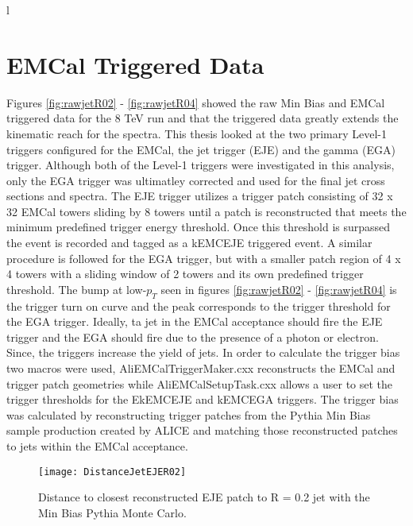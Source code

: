 

l

\section{EMCal Triggered Data}

Figures \ref{fig:rawjetR02} - \ref{fig:rawjetR04} showed the raw Min Bias and EMCal triggered data for the 8 TeV run and that the triggered data greatly extends the kinematic reach for the spectra.  This thesis looked at the two primary Level-1 triggers configured for the EMCal, the jet trigger (EJE) and the gamma (EGA) trigger\cite{Bourrion:2010js}.  Although both of the Level-1 triggers were investigated in this analysis, only the EGA trigger was ultimatley corrected  and used for the final jet cross sections and spectra.  The EJE trigger utilizes a trigger patch consisting of 32 x 32 EMCal towers sliding by 8 towers until a patch is reconstructed that meets the minimum predefined trigger energy threshold.  Once this threshold is surpassed the event is recorded and tagged as a kEMCEJE triggered event.  A similar procedure is followed for the EGA trigger, but with a smaller patch region of 4 x 4 towers with a sliding window of 2 towers and its own predefined trigger threshold.  The bump at low-$p_{T}$ seen in figures \ref{fig:rawjetR02} - \ref{fig:rawjetR04} is the trigger turn on curve and the peak corresponds to the trigger threshold for the EGA trigger.  Ideally, ta jet in the EMCal acceptance should fire the EJE trigger and the EGA should fire due to the presence of a photon or electron.  Since, the triggers increase the yield of jets.  In order to calculate the trigger bias two macros were used, AliEMCalTriggerMaker.cxx reconstructs the EMCal and trigger patch geometries while AliEMCalSetupTask.cxx allows a user to set the trigger thresholds for the EkEMCEJE and kEMCEGA triggers.  The trigger bias was calculated by reconstructing trigger patches from the Pythia Min Bias sample production created by ALICE and matching those reconstructed patches to jets within the EMCal acceptance.  

\begin{figure}[h]
\texttt{[image: DistanceJetEJER02]}
\centering
\caption{Distance to closest reconstructed EJE patch to R = 0.2 jet with the Min Bias Pythia Monte Carlo.}
\label{fig:DisJetEJE}
\end{figure}

